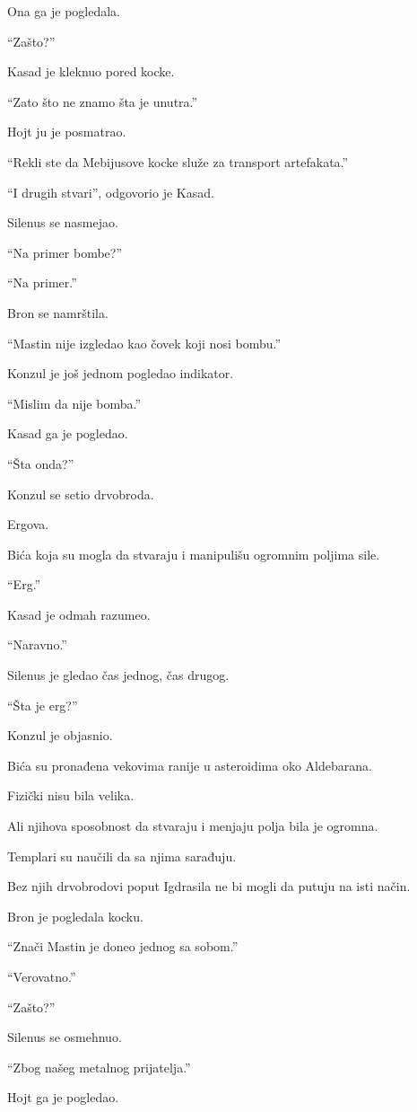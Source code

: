 Ona ga je pogledala.

``Zašto?''

Kasad je kleknuo pored kocke.

``Zato što ne znamo šta je unutra.''

Hojt ju je posmatrao.

``Rekli ste da Mebijusove kocke služe za transport artefakata.''

``I drugih stvari'', odgovorio je Kasad.

Silenus se nasmejao.

``Na primer bombe?''

``Na primer.''

Bron se namrštila.

``Mastin nije izgledao kao čovek koji nosi bombu.''

Konzul je još jednom pogledao indikator.

``Mislim da nije bomba.''

Kasad ga je pogledao.

``Šta onda?''

Konzul se setio drvobroda.

Ergova.

Bića koja su mogla da stvaraju i manipulišu ogromnim poljima sile.

``Erg.''

Kasad je odmah razumeo.

``Naravno.''

Silenus je gledao čas jednog, čas drugog.

``Šta je erg?''

Konzul je objasnio.

Bića su pronađena vekovima ranije u asteroidima oko Aldebarana.

Fizički nisu bila velika.

Ali njihova sposobnost da stvaraju i menjaju polja bila je ogromna.

Templari su naučili da sa njima sarađuju.

Bez njih drvobrodovi poput Igdrasila ne bi mogli da putuju na isti način.

Bron je pogledala kocku.

``Znači Mastin je doneo jednog sa sobom.''

``Verovatno.''

``Zašto?''

Silenus se osmehnuo.

``Zbog našeg metalnog prijatelja.''

Hojt ga je pogledao.

